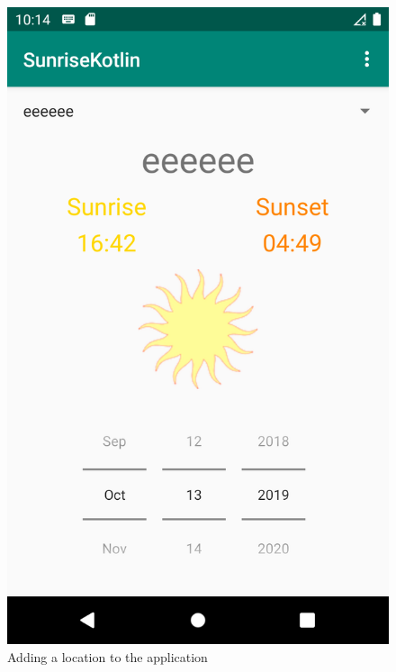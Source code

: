 \documentclass{scrartcl}
\begin{document}
\begin{figure}[h]
    \includegraphics[scale=0.2]{images/screen4.png}
    \caption{Adding a location to the application}
\end{figure}

\pagebreak
\end{document}
